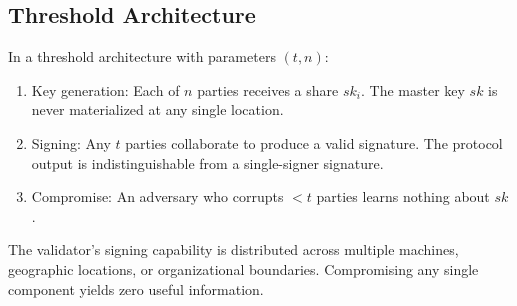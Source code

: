 \subsection{Threshold Architecture}

In a threshold architecture with parameters $(t, n)$:

\begin{enumerate}[leftmargin=2em]
  \item Key generation: Each of $n$ parties receives a share $sk_i$. The master key
        $sk$ is never materialized at any single location.
  \item Signing: Any $t$ parties collaborate to produce a valid signature. The protocol
        output is indistinguishable from a single-signer signature.
  \item Compromise: An adversary who corrupts $< t$ parties learns nothing about $sk$.
\end{enumerate}

The validator's signing capability is distributed across multiple machines,
geographic locations, or organizational boundaries. Compromising any single
component yields zero useful information.

